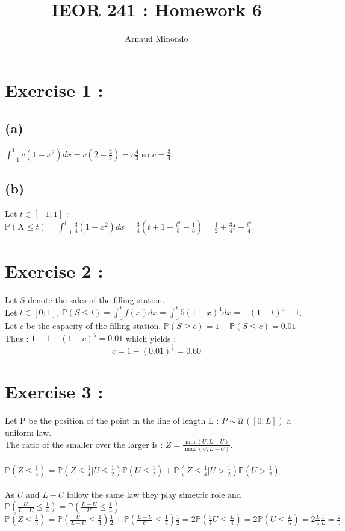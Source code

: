 \documentclass{article}
\title{IEOR 241 : Homework 6}
\author{Arnaud Minondo}
\begin{document}
\maketitle
\section*{Exercise 1 :}
\subsection*{(a)}
$\int_{-1}^{1}c(1-x^2)dx = c(2 - \frac{2}{3}) = c\frac{4}{3}$ so $c = \frac{3}{4} $.
\subsection*{(b)}
Let $t\in[-1;1]$ : $\mathbb{P}(X\leq t)=\int_{-1}^{t}\frac{3}{4}(1-x^2)dx = \frac{3}{4}(t+1 - \frac{t^3}{3}-\frac{1}{3}) = \frac{1}{2}+\frac{3}{4}t-\frac{t^3}{4}$.
\section*{Exercise 2 :}
Let $S$ denote the sales of the filling station.\\
Let $t\in[0;1]$, $\mathbb{P}(S\leq t) = \int_{0}^t f(x)dx = \int_{0}^t 5(1-x)^4dx = -(1-t)^5+1$.
\\
Let $c$ be the capacity of the filling station. $\mathbb{P}(S\ge c) = 1- \mathbb{P}(S\leq c) = 0.01$
\\
Thus : $1-1+(1-c)^5 = 0.01$ which yields : $$\boxed{c = 1 - (0.01)^\frac{1}{5} = 0.60}$$
\section*{Exercise 3 :}
Let P be the position of the point in the line of length L : $P\sim\mathcal{U}([0;L])$ a uniform law.
\\
The ratio of the smaller over the larger is : $Z = \frac{\min(U,L-U)}{\max(U,L-U)}$.
\\\\
$\mathbb{P}(Z\leq \frac{1}{4}) = \mathbb{P}(Z\leq \frac{1}{4}| U\leq \frac{1}{2})\mathbb{P}(U\leq \frac{1}{2})+\mathbb{P}(Z\leq \frac{1}{4}|U> \frac{1}{2})\mathbb{P}(U> \frac{1}{2})$
\\\\
As $U$ and $L-U$ follow the same law they play simetric role and $\mathbb{P}(\frac{U}{L-U}\leq\frac{1}{4}) = \mathbb{P}(\frac{L-U}{U}\leq \frac{1}{4})$
\\
$\mathbb{P}(Z\leq \frac{1}{4}) = \mathbb{P}(\frac{U}{L-U}\leq \frac{1}{4})\frac{1}{2}+ \mathbb{P}(\frac{L-U}{U}\leq \frac{1}{4})\frac{1}{2} = 2\mathbb{P}(\frac{5}{4}U\leq \frac{L}{4}) = 2\mathbb{P}(U\leq \frac{L}{5}) = 2\frac{L}{5}\frac{1}{L} = \frac{2}{5}$
\end{document}
